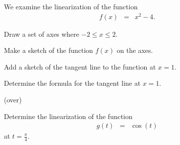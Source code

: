 \begin{problem}
\item We examine the linearization of the function
  \begin{eqnarray*}
    f(x) & = & x^2-4.
  \end{eqnarray*}
  \begin{subproblem}
  \item Draw a set of axes where $-2\leq x \leq 2$.


    \vfill

  \item Make a sketch of the function $f(x)$ on the axes.
  \item Add a sketch of the tangent line to the function at $x=1$.
  \item Determine the formula for the tangent line at $x=1$.
    \vfill

    (over)
  \end{subproblem}
  \clearpage
\item Determine the linearization of the function
  \begin{eqnarray*}
    g(t) & = & \cos(t)
  \end{eqnarray*}
  at $t=\frac{\pi}{4}$.
\end{problem}


